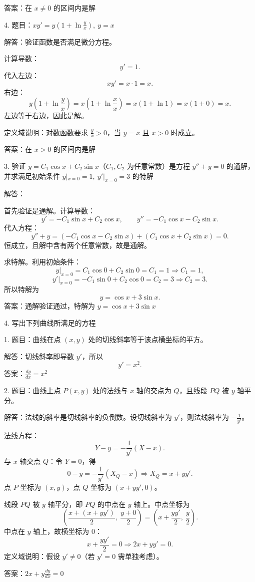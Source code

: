 答案：在 \(x\ne0\) 的区间内是解

4. 题目：\(xy'=y\left(1+\ln\frac{y}{x}\right),\ y=x\)

解答：验证函数是否满足微分方程。

计算导数：
\[ y'=1. \]
代入左边：
\[ xy'=x\cdot1=x. \]
右边：
\[ y\left(1+\ln\frac{y}{x}\right)=x\left(1+\ln\frac{x}{x}\right)=x(1+\ln1)=x(1+0)=x. \]
左边等于右边，因此是解。

定义域说明：对数函数要求 \(\frac{y}{x}>0\)，当 \(y=x\) 且 \(x>0\) 时成立。

答案：在 \(x>0\) 的区间内是解

3. 验证 \(y=C_{1}\cos x+C_{2}\sin x\)（\(C_{1},C_{2}\) 为任意常数）是方程 \(y''+y=0\) 的通解，并求满足初始条件 \(y|_{x=0}=1,\ y'|_{x=0}=3\) 的特解

解答：

首先验证是通解。计算导数：
\[ y'=-C_{1}\sin x+C_{2}\cos x,\qquad y''=-C_{1}\cos x-C_{2}\sin x. \]
代入方程：
\[ y''+y=(-C_{1}\cos x-C_{2}\sin x)+(C_{1}\cos x+C_{2}\sin x)=0. \]
恒成立，且解中含有两个任意常数，故是通解。

求特解。利用初始条件：
\[ y|_{x=0}=C_{1}\cos0+C_{2}\sin0=C_{1}=1\Rightarrow C_{1}=1, \]
\[ y'|_{x=0}=-C_{1}\sin0+C_{2}\cos0=C_{2}=3\Rightarrow C_{2}=3. \]
所以特解为
\[ y=\cos x+3\sin x. \]
答案：通解验证通过，特解为 \(y=\cos x+3\sin x\)

4. 写出下列曲线所满足的方程

1. 题目：曲线在点 \((x,y)\) 处的切线斜率等于该点横坐标的平方。

解答：切线斜率即导数 \(y'\)，所以
\[ y'=x^{2}. \]
答案：\(\frac{dy}{dx}=x^{2}\)

2. 题目：曲线上点 \(P(x,y)\) 处的法线与 \(x\) 轴的交点为 \(Q\)，且线段 \(PQ\) 被 \(y\) 轴平分。

解答：法线的斜率是切线斜率的负倒数。设切线斜率为 \(y'\)，则法线斜率为 \(-\frac{1}{y'}\)。

法线方程：
\[ Y-y=-\frac{1}{y'}(X-x). \]
与 \(x\) 轴交点 \(Q\)：令 \(Y=0\)，得
\[ 0-y=-\frac{1}{y'}(X_{Q}-x)\Rightarrow X_{Q}=x+yy'. \]
点 \(P\) 坐标为 \((x,y)\)，点 \(Q\) 坐标为 \((x+yy',0)\)。

线段 \(PQ\) 被 \(y\) 轴平分，即 \(PQ\) 的中点在 \(y\) 轴上。中点坐标为
\[ \left(\frac{x+(x+yy')}{2},\ \frac{y+0}{2}\right)=\left(x+\frac{yy'}{2},\ \frac{y}{2}\right). \]
中点在 \(y\) 轴上，故横坐标为 \(0\)：
\[ x+\frac{yy'}{2}=0\Rightarrow2x+yy'=0. \]
定义域说明：假设 \(y'\ne0\)（若 \(y'=0\) 需单独考虑）。

答案：\(2x+y\frac{dy}{dx}=0\)

